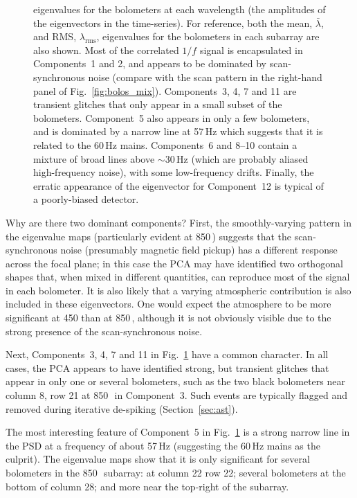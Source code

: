\documentclass[useAMS,usenatbib,nofootinbib]{mn2e}
\newcommand{\rms}{RMS}
\begin{document}
\begin{figure}
{  eigenvalues for the bolometers at each wavelength (the amplitudes of
  the eigenvectors in the time-series). For reference, both the mean,
  $\bar{\lambda}$, and \rms, $\lambda_\mathrm{rms}$, eigenvalues for
  the bolometers in each subarray are also shown. Most of the
  correlated $1/f$ signal is encapsulated in Components~1 and 2, and
  appears to be dominated by scan-synchronous noise (compare with the
  scan pattern in the right-hand panel of Fig.~\ref{fig:bolos_mix}).
  Components~3, 4, 7 and 11 are transient glitches that only appear in
  a small subset of the bolometers. Component~5 also appears in only a
  few bolometers, and is dominated by a narrow line at 57\,Hz which
  suggests that it is related to the 60\,Hz mains. Components~6 and
  8--10 contain a mixture of broad lines above $\sim$30\,Hz (which are
  probably aliased high-frequency noise), with some low-frequency
  drifts. Finally, the erratic appearance of the eigenvector for
  Component~12 is typical of a poorly-biased detector.}
\label{fig:pca}
\end{figure}

Why are there two dominant components? First, the smoothly-varying
pattern in the eigenvalue maps (particularly evident at 850\,\micron)
suggests that the scan-synchronous noise (presumably magnetic field
pickup) has a different response across the focal plane; in this case
the PCA may have identified two orthogonal shapes that, when mixed in
different quantities, can reproduce most of the signal in each
bolometer. It is also likely that a varying atmospheric contribution
is also included in these eigenvectors. One would expect the
atmosphere to be more significant at 450 than at 850\,\micron,
although it is not obviously visible due to the strong presence of the
scan-synchronous noise.

Next, Components~3, 4, 7 and 11 in Fig.~\ref{fig:pca} have a common
character. In all cases, the PCA appears to have identified strong,
but transient glitches that appear in only one or several bolometers,
such as the two black bolometers near column 8, row 21 at
850\,\micron\ in Component~3. Such events are typically flagged and
removed during iterative de-spiking (Section~\ref{sec:ast}).

The most interesting feature of Component~5 in Fig.~\ref{fig:pca} is a
strong narrow line in the PSD at a frequency of about 57\,Hz
(suggesting the 60\,Hz mains as the culprit). The eigenvalue maps show
that it is only significant for several bolometers in the
850\,\micron\ subarray: at column 22 row 22; several bolometers at the
bottom of column 28; and more near the top-right of the subarray.
\end{document}
